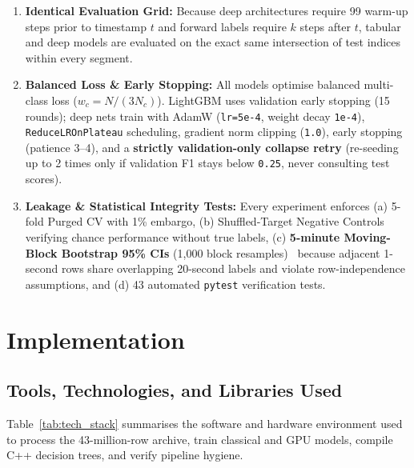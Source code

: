 \documentclass[12pt,a4paper,oneside]{report}
\newcommand{\code}[1]{\texttt{#1}}
\begin{document}
\begin{enumerate}
  \item \textbf{Identical Evaluation Grid:} Because deep architectures require 99 warm-up steps prior to timestamp $t$ and forward labels require $k$ steps after $t$, tabular and deep models are evaluated on the exact same intersection of test indices within every segment.
  \item \textbf{Balanced Loss \& Early Stopping:} All models optimise balanced multi-class loss ($w_c = N/(3 N_c)$). LightGBM uses validation early stopping (15 rounds); deep nets train with AdamW (\code{lr=5e-4}, weight decay \code{1e-4}), \code{ReduceLROnPlateau} scheduling, gradient norm clipping (\code{1.0}), early stopping (patience 3--4), and a \textbf{strictly validation-only collapse retry} (re-seeding up to 2 times only if validation F1 stays below \code{0.25}, never consulting test scores).
  \item \textbf{Leakage \& Statistical Integrity Tests:} Every experiment enforces (a) 5-fold Purged CV with 1\% embargo, (b) Shuffled-Target Negative Controls verifying chance performance without true labels, (c) \textbf{5-minute Moving-Block Bootstrap 95\% CIs} (1,000 block resamples)~\cite{kunsch1989} because adjacent 1-second rows share overlapping 20-second labels and violate row-independence assumptions, and (d) 43 automated \code{pytest} verification tests.
\end{enumerate}

\chapter{Implementation}

\section{Tools, Technologies, and Libraries Used}

Table~\ref{tab:tech_stack} summarises the software and hardware environment used to process the 43-million-row archive, train classical and GPU models, compile C++ decision trees, and verify pipeline hygiene.
\end{document}
